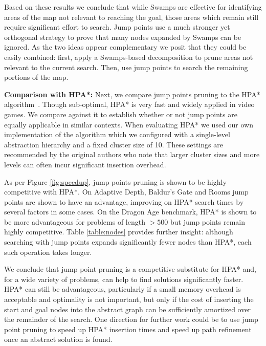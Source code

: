 Based on these results we conclude that while Swamps are effective for
identifying areas of the map not relevant to reaching the goal, those areas
which remain still require significant effort to search.  Jump points use a much
stronger yet orthogonal strategy to prove that many nodes expanded by Swamps can
be ignored.  As the two ideas appear complementary we posit that they could be
easily combined: first, apply a Swamps-based decomposition to prune areas not
relevant to the current search.  Then, use jump points to search the remaining
portions of the map.

\textbf{Comparison with HPA*: }
Next, we compare jump points pruning to the HPA* algorithm~\cite{botea04}.
Though sub-optimal, HPA* is very fast and widely applied in video games. We
compare against it to establish whether or not jump points are equally
applicable in similar contexts.  When evaluating HPA* we used our own
implementation of the algorithm which we configured with a single-level
abstraction hierarchy and a fixed cluster size of 10.  These settings are
recommended by the original authors who note that larger cluster sizes and more
levels can often incur significant insertion overhead.

As per Figure \ref{fig:speedup}, jump points pruning is shown to be 
highly competitive with HPA*.
On Adaptive Depth, Baldur's Gate and Rooms jump points are shown to have an 
advantage, improving on HPA* search times by several factors in some cases.
On the Dragon Age benchmark, HPA* is shown to be more advantageous for 
problems of length $> 500$ but jump points remain highly competitive.
Table \ref{table:nodes} provides further insight: although searching with jump 
points expands significantly fewer nodes than HPA*, each such operation
takes longer.

We conclude that jump point pruning is a competitive substitute for HPA* and,
for a wide variety of problems, can help to find solutions significantly faster.
HPA*
can still be advantageous, particularly if a small memory overhead is acceptable
and optimality is not important, but only if the cost of inserting the start and
goal nodes into the abstract graph can be sufficiently amortized over the
remainder of the search.  One direction for further work could be to use jump
point pruning to speed up HPA* insertion times and speed up path refinement once
an abstract solution is found.
